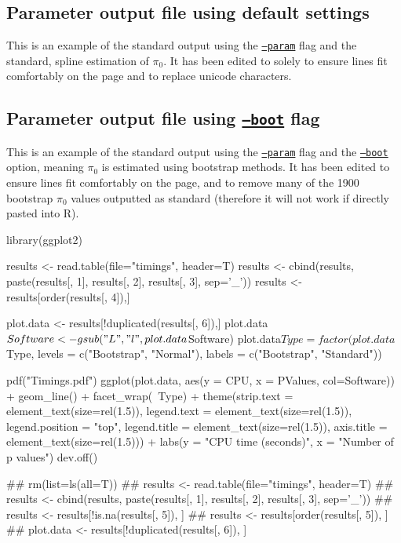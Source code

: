 \documentclass{amsart}
\begin{document}
\subsection{Parameter output file using default settings}
\label{sec:suppspline}
This is an example of the standard output using the \underline{\texttt{--param}} flag and the standard, spline estimation of $\pi_0$. It has been edited to solely to ensure lines fit comfortably on the page and to replace unicode characters.



\subsection{Parameter output file using \underline{\texttt{--boot}} flag}
\label{sec:suppboot}
This is an example of the standard output using the \underline{\texttt{--param}} flag and the \underline{\texttt{--boot}} option, meaning $\pi_0$ is estimated using bootstrap methods. It has been edited to ensure lines fit comfortably on the page, and to remove many of the 1900 bootstrap $\pi_0$ values outputted as standard (therefore it will not work if directly pasted into R).


\iffalse
library(ggplot2)

results <- read.table(file="timings", header=T)
results <- cbind(results, paste(results[, 1], results[, 2], results[, 3], sep='_'))
results <- results[order(results[, 4]),]

plot.data <- results[!duplicated(results[, 6]),]
plot.data$Software <- gsub("L", "l", plot.data$Software)
plot.data$Type = factor(plot.data$Type, levels = c("Bootstrap", "Normal"), labels = c("Bootstrap", "Standard"))

pdf("Timings.pdf")
ggplot(plot.data, aes(y = CPU, x = PValues, col=Software)) + geom_line() +
          facet_wrap(~Type) +
          theme(strip.text = element_text(size=rel(1.5)), legend.text = element_text(size=rel(1.5)),
                legend.position = "top", legend.title = element_text(size=rel(1.5)),
                axis.title = element_text(size=rel(1.5))) +
          labs(y = "CPU time (seconds)", x = "Number of p values")
dev.off()

## rm(list=ls(all=T))
## results <- read.table(file="timings", header=T)
## results <- cbind(results, paste(results[, 1], results[, 2], results[, 3], sep='_'))
## results <- results[!is.na(results[, 5]), ]
## results <- results[order(results[, 5]), ]
## plot.data <- results[!duplicated(results[, 6]), ]
\end{document}
